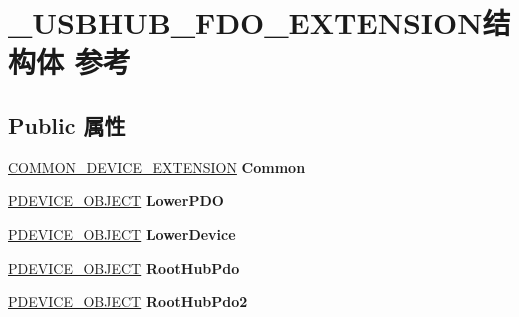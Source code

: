 \hypertarget{struct___u_s_b_h_u_b___f_d_o___e_x_t_e_n_s_i_o_n}{}\section{\+\_\+\+U\+S\+B\+H\+U\+B\+\_\+\+F\+D\+O\+\_\+\+E\+X\+T\+E\+N\+S\+I\+O\+N结构体 参考}
\label{struct___u_s_b_h_u_b___f_d_o___e_x_t_e_n_s_i_o_n}
\subsection*{Public 属性}
\begin{DoxyCompactItemize}
\item 
\mbox{\label{struct___u_s_b_h_u_b___f_d_o___e_x_t_e_n_s_i_o_n_a4ca20a01a0e0a1509f350d583e56b8aa}} 
\hyperlink{struct_c_o_m_m_o_n___d_e_v_i_c_e___e_x_t_e_n_s_i_o_n}{C\+O\+M\+M\+O\+N\+\_\+\+D\+E\+V\+I\+C\+E\+\_\+\+E\+X\+T\+E\+N\+S\+I\+ON} {\bfseries Common}
\item 
\mbox{\label{struct___u_s_b_h_u_b___f_d_o___e_x_t_e_n_s_i_o_n_a129a5750eaa3ae2e0ca050507cd534f0}} 
\hyperlink{struct___d_e_v_i_c_e___o_b_j_e_c_t}{P\+D\+E\+V\+I\+C\+E\+\_\+\+O\+B\+J\+E\+CT} {\bfseries Lower\+P\+DO}
\item 
\mbox{\label{struct___u_s_b_h_u_b___f_d_o___e_x_t_e_n_s_i_o_n_a6f8041792491b18ec28ae2bde5ff40c3}} 
\hyperlink{struct___d_e_v_i_c_e___o_b_j_e_c_t}{P\+D\+E\+V\+I\+C\+E\+\_\+\+O\+B\+J\+E\+CT} {\bfseries Lower\+Device}
\item 
\mbox{\label{struct___u_s_b_h_u_b___f_d_o___e_x_t_e_n_s_i_o_n_ad6c12e08fdc7d80a55c5321621712d80}} 
\hyperlink{struct___d_e_v_i_c_e___o_b_j_e_c_t}{P\+D\+E\+V\+I\+C\+E\+\_\+\+O\+B\+J\+E\+CT} {\bfseries Root\+Hub\+Pdo}
\item 
\mbox{\label{struct___u_s_b_h_u_b___f_d_o___e_x_t_e_n_s_i_o_n_a771307d38261fba26c0fa7fed023785d}} 
\hyperlink{struct___d_e_v_i_c_e___o_b_j_e_c_t}{P\+D\+E\+V\+I\+C\+E\+\_\+\+O\+B\+J\+E\+CT} {\bfseries Root\+Hub\+Pdo2}

\end{DoxyCompactItemize}
